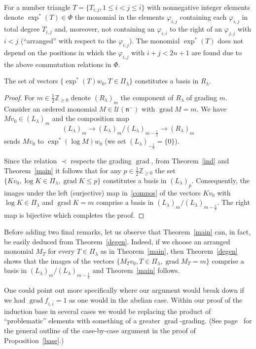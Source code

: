 \documentclass[ALCO,ThmDefs,Unicode]{cedram}
\DeclareMathOperator{\grad}{grad}
\newcommand{\la}{\lambda}
\begin{document}
For a number triangle $T=\{T_{i,j},1\le i<j\le\overline i\}$ with nonnegative integer elements denote $\exp^*(T)\in\Phi$ the monomial in the elements $\varphi_{i,j}$ containing each $\varphi_{i,j}$ in total degree $T_{i,j}$ and, moreover, not containing an $\varphi_{i,\overline i}$ to the right of an $\varphi_{j,\overline j}$ with $i<j$ (``arranged'' with respect to the $\varphi_{i,j}$). The monomial $\exp^*(T)$ does not depend on the positions in which the $\varphi_{i,j}$ with $i+j<2n+1$ are found due to the above commutation relations in $\Phi$.

\begin{theo}\label{degen}
The set of vectors $\{\exp^*(T)w_0,T\in\Pi_\la\}$ constitutes a basis in $R_\la$.
\end{theo}
\begin{proof}
For $m\in\frac12\mathbb Z_{\ge 0}$ denote $(R_\la)_m$ the component of $R_\la$ of grading $m$. Consider an ordered monomial $M\in\mathcal U(\mathfrak n^-)$ with $\grad M=m$. We have $Mv_0\in(L_\la)_m$ and the composition map
\begin{equation}\label{compos}
(L_\la)_m\to(L_\la)_m/(L_\la)_{m-\frac12}\to(R_\la)_m
\end{equation}
sends $M v_0$ to $\exp^*(\log M)w_0$ (we set $(L_\la)_{-\frac12}=\{0\}$).

Since the relation $\prec$ respects the grading $\grad$, from Theorem~\ref{ind} and Theorem~\ref{main} it follows that for any $p\in\frac12\mathbb Z_{\ge 0}$ the set $\{Kv_0,\log K\in\Pi_\la,\grad K\le p\}$ constitutes a basis in $(L_\la)_p$. Consequently, the images under the left (surjective) map in~\eqref{compos} of the vectors $Kv_0$ with $\log K\in\Pi_\la$ and $\grad K=m$ comprise a basis in $(L_\la)_m/(L_\la)_{m-\frac12}$. The right map is bijective which completes the proof.
\end{proof}

Before adding two final remarks, let us observe that Theorem~\ref{main} can, in fact, be easily deduced from Theorem~\ref{degen}. Indeed, if we choose an arranged monomial $M_T$ for every $T\in\Pi_\la$ as in Theorem~\ref{main}, then Theorem~\ref{degen} shows that the images of the vectors $\{M_Tv_0,T\in\Pi_\la,\grad M_T=m\}$ comprise a basis in $(L_\la)_m/(L_\la)_{m-\frac12}$ and Theorem~\ref{main} follows.

\begin{rema}
One could point out more specifically where our argument would break down if we had $\grad f_{i,\overline i}=1$ as one would in the abelian case. Within our proof of the induction base in several cases we would be replacing the product of ``problematic'' elements with something of a greater $\grad$-grading. (See page~\pageref{outline} for the general outline of the case-by-case argument in the proof of Proposition~\ref{base}.)
\end{rema}
\end{document}
